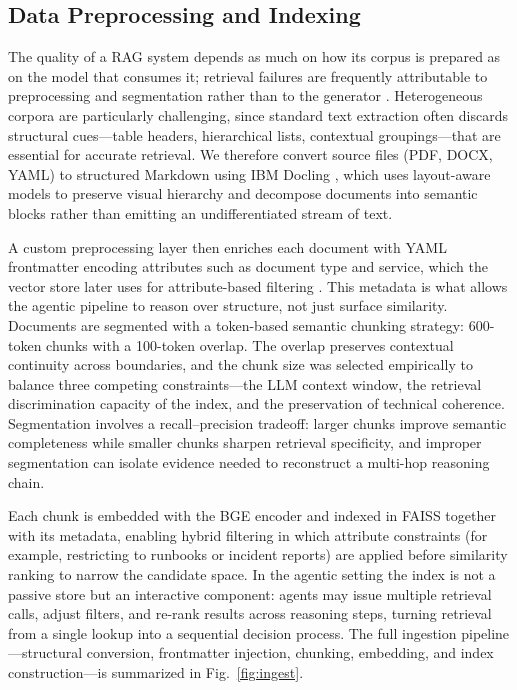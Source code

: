 \documentclass[conference]{IEEEtran}
\begin{document}
\subsection{Data Preprocessing and Indexing}
The quality of a RAG system depends as much on how its corpus is prepared as on the model that consumes it; retrieval failures are frequently attributable to preprocessing and segmentation rather than to the generator \cite{lewis2020rag, gao2023survey}. Heterogeneous corpora are particularly challenging, since standard text extraction often discards structural cues---table headers, hierarchical lists, contextual groupings---that are essential for accurate retrieval. We therefore convert source files (PDF, DOCX, YAML) to structured Markdown using IBM Docling \cite{ibm2025docling, ibm2025doclingtech}, which uses layout-aware models to preserve visual hierarchy and decompose documents into semantic blocks rather than emitting an undifferentiated stream of text.

A custom preprocessing layer then enriches each document with YAML frontmatter encoding attributes such as document type and service, which the vector store later uses for attribute-based filtering \cite{wandb2024agentic}. This metadata is what allows the agentic pipeline to reason over structure, not just surface similarity. Documents are segmented with a token-based semantic chunking strategy: 600-token chunks with a 100-token overlap. The overlap preserves contextual continuity across boundaries, and the chunk size was selected empirically to balance three competing constraints---the LLM context window, the retrieval discrimination capacity of the index, and the preservation of technical coherence. Segmentation involves a recall--precision tradeoff: larger chunks improve semantic completeness while smaller chunks sharpen retrieval specificity, and improper segmentation can isolate evidence needed to reconstruct a multi-hop reasoning chain.

Each chunk is embedded with the BGE encoder and indexed in FAISS together with its metadata, enabling hybrid filtering in which attribute constraints (for example, restricting to runbooks or incident reports) are applied before similarity ranking to narrow the candidate space. In the agentic setting the index is not a passive store but an interactive component: agents may issue multiple retrieval calls, adjust filters, and re-rank results across reasoning steps, turning retrieval from a single lookup into a sequential decision process. The full ingestion pipeline---structural conversion, frontmatter injection, chunking, embedding, and index construction---is summarized in Fig.~\ref{fig:ingest}.
\end{document}
